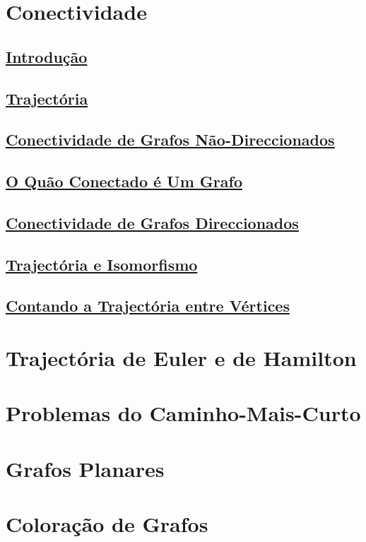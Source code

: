 \section{Conectividade}
\subsection*{\underline{Introdução}}
\subsection*{\underline{Trajectória}}
\subsection*{\underline{Conectividade de Grafos Não-Direccionados}}
\subsection*{\underline{O Quão Conectado é Um Grafo}}
\subsection*{\underline{Conectividade de Grafos Direccionados}}
\subsection*{\underline{Trajectória e Isomorfismo}}
\subsection*{\underline{Contando a Trajectória entre Vértices}}

\section{Trajectória de Euler e de Hamilton}

\section{Problemas do Caminho-Mais-Curto}

\section{Grafos Planares}

\section{Coloração de Grafos}









